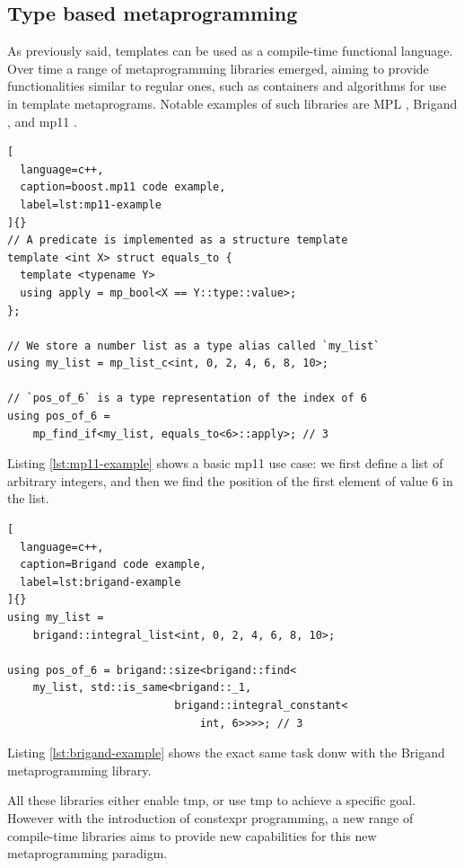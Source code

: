 \documentclass[../main]{subfiles}
\begin{document}
\subsection{
  Type based metaprogramming
}

As previously said, \cpp templates can be used as a compile-time
functional language. Over time a range of metaprogramming libraries emerged,
aiming to provide functionalities similar to regular ones, such as containers
and algorithms for use in template metaprograms. Notable examples of such
libraries are MPL \cite{mpl}, Brigand \cite{brigand}, and mp11 \cite{mp11}.

\begin{lstlisting}[
  language=c++,
  caption=boost.mp11 code example,
  label=lst:mp11-example
]{}
// A predicate is implemented as a structure template
template <int X> struct equals_to {
  template <typename Y>
  using apply = mp_bool<X == Y::type::value>;
};

// We store a number list as a type alias called `my_list`
using my_list = mp_list_c<int, 0, 2, 4, 6, 8, 10>;

// `pos_of_6` is a type representation of the index of 6
using pos_of_6 =
    mp_find_if<my_list, equals_to<6>::apply>; // 3
\end{lstlisting}

Listing \ref{lst:mp11-example} shows a basic mp11 use case: we first define a
list of arbitrary integers, and then we find the position of the first element
of value 6 in the list.

\clearpage%

\begin{lstlisting}[
  language=c++,
  caption=Brigand code example,
  label=lst:brigand-example
]{}
using my_list =
    brigand::integral_list<int, 0, 2, 4, 6, 8, 10>;

using pos_of_6 = brigand::size<brigand::find<
    my_list, std::is_same<brigand::_1,
                          brigand::integral_constant<
                              int, 6>>>>; // 3
\end{lstlisting}

Listing \ref{lst:brigand-example} shows the exact same task donw with the
Brigand metaprogramming library.

All these libraries either enable \gls{tmp}, or use \gls{tmp} to achieve
a specific goal. However with the introduction of \gls{constexpr} programming,
a new range of compile-time libraries aims to provide new capabilities
for this new metaprogramming paradigm.
\end{document}

